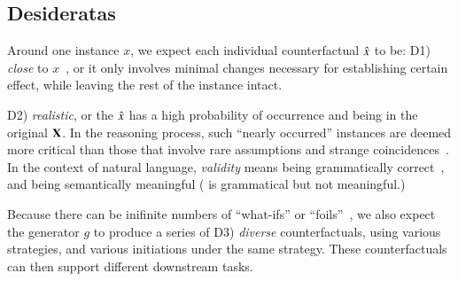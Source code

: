 \subsection{Desideratas}
Around one instance $x$, we expect each individual counterfactual $\hat{x}$ to be: 
D1) \emph{close} to $x$~\cite{pearl2018causal}, or it only involves minimal changes necessary for establishing certain effect, while leaving the rest of the instance intact.

D2) \emph{realistic}, or the $\hat{x}$ has a high probability of occurrence and being in the original $\mathbf{X}$.
In the reasoning process, such ``nearly occurred'' instances are deemed more critical than those that involve rare assumptions and strange coincidences~\cite{kahneman}.
In the context of natural language, \emph{validity} means being grammatically correct~\cite{morris2020textattack}, and being semantically meaningful (\eg {} is grammatical but not meaningful.) 

Because there can be inifinite numbers of ``what-ifs'' or ``foils''~\cite{pearl2018causal, kahneman}, we also expect the generator $g$ to produce a series of D3) \emph{diverse} counterfactuals, using various strategies, and various initiations under the same strategy.
These counterfactuals can then support different downstream tasks. 





